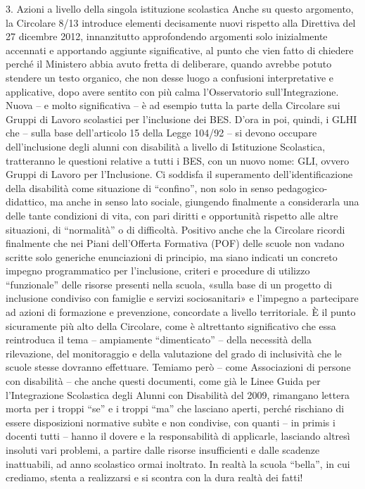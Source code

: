 3. Azioni a livello della singola istituzione scolastica
Anche su questo argomento, la Circolare 8/13 introduce elementi decisamente nuovi rispetto alla Direttiva del 27 dicembre 2012, innanzitutto approfondendo argomenti solo inizialmente accennati e apportando aggiunte significative, al punto che vien fatto di chiedere perché il Ministero abbia avuto fretta di deliberare, quando avrebbe potuto stendere un testo organico, che non desse luogo a confusioni interpretative e applicative, dopo avere sentito con più calma l’Osservatorio sull’Integrazione.
Nuova – e molto significativa – è ad esempio tutta la parte della Circolare sui Gruppi di Lavoro scolastici per l’inclusione dei BES. D’ora in poi, quindi, i GLHI che – sulla base dell’articolo 15 della Legge 104/92 – si devono occupare dell’inclusione degli alunni con disabilità a livello di Istituzione Scolastica, tratteranno le questioni relative a tutti i BES, con un nuovo nome: GLI, ovvero Gruppi di Lavoro per l’Inclusione.
Ci soddisfa il superamento dell’identificazione della disabilità come situazione di “confino”, non solo in senso pedagogico-didattico, ma anche in senso lato sociale, giungendo finalmente a considerarla una delle tante condizioni di vita, con pari diritti e opportunità rispetto alle altre situazioni, di “normalità” o di difficoltà.
Positivo anche che la Circolare ricordi finalmente che nei Piani dell’Offerta Formativa (POF) delle scuole non vadano scritte solo generiche enunciazioni di principio, ma siano indicati un concreto impegno programmatico per l’inclusione, criteri e procedure di utilizzo “funzionale” delle risorse presenti nella scuola, «sulla base di un progetto di inclusione condiviso con famiglie e servizi sociosanitari» e l’impegno a partecipare ad azioni di formazione e prevenzione, concordate a livello territoriale.
È il punto sicuramente più alto della Circolare, come è altrettanto significativo che essa reintroduca il tema – ampiamente “dimenticato” – della necessità della rilevazione, del monitoraggio e della valutazione del grado di inclusività che le scuole stesse dovranno effettuare.
Temiamo però – come Associazioni di persone con disabilità – che anche questi documenti, come già le Linee Guida per l’Integrazione Scolastica degli Alunni con Disabilità del 2009, rimangano lettera morta per i troppi “se” e i troppi “ma” che lasciano aperti, perché rischiano di essere disposizioni normative subìte e non condivise, con quanti – in primis i docenti tutti – hanno il dovere e la responsabilità di applicarle, lasciando altresì insoluti vari problemi, a partire dalle risorse insufficienti e dalle scadenze inattuabili, ad anno scolastico ormai inoltrato.
In realtà la scuola “bella”, in cui crediamo, stenta a realizzarsi e si scontra con la dura realtà dei fatti!

